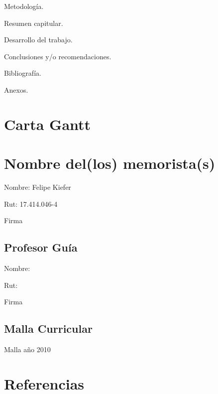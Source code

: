 \documentclass[a4papper,11pt]{article}
\begin{document}
    Metodología.

    Resumen capitular.

    Desarrollo del trabajo.

    Conclusiones y/o recomendaciones.

    Bibliografía.

    Anexos.

  \section{Carta Gantt}

\pagebreak
\section{Nombre del(los) memorista(s)}

Nombre:     Felipe Kiefer

Rut:        17.414.046-4

Firma

\subsection{Profesor Guía}

Nombre:

Rut:

Firma

\subsection{Malla Curricular}

Malla año 2010

\pagebreak

\section{Referencias}
\printbibliography

% 
%  
\end{document}
